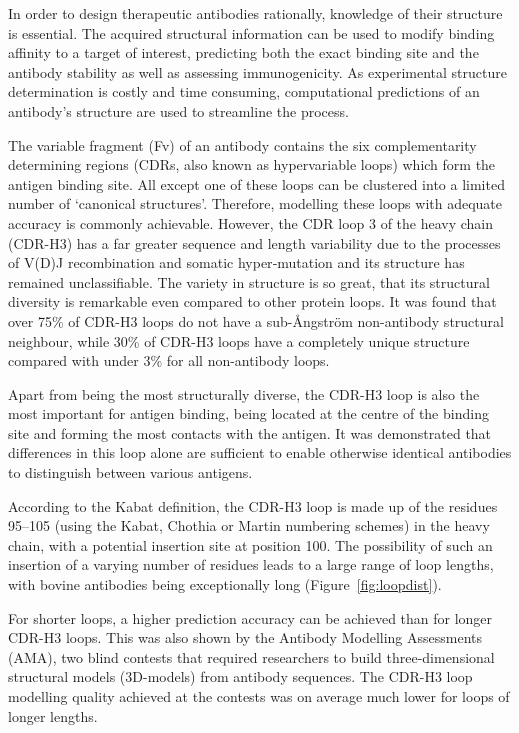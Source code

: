 \documentclass[12pt]{article}
\begin{document}
In order to design therapeutic antibodies rationally, knowledge of
their structure is essential. The acquired structural information can
be used to modify binding affinity to a target of interest,
predicting both the exact binding site and the antibody stability as
well as assessing immunogenicity\cite{Abhinandan2007}. As
experimental structure determination is costly and time
consuming, computational predictions of an antibody's structure are
used to streamline the process.

The variable
fragment (Fv) of an antibody contains the six complementarity determining regions
(CDRs, also known as hypervariable loops) which form the antigen binding site.
All except one of these loops can be clustered
into a limited number of `canonical structures'\cite{Al-Lazikani}. Therefore, modelling
these loops with adequate accuracy is commonly
achievable\cite{North2011}.  However, the CDR loop 3 of the 
heavy chain (CDR-H3) has a far greater sequence and length variability due to the
processes of V(D)J recombination and somatic hyper‐mutation and its
structure has remained unclassifiable\cite{Finn2016}. The variety in
structure is so great, that its structural diversity is remarkable
even compared to other protein loops\cite{Regep2017}. It was found
that over 75\% of CDR-H3 loops do not have a sub-{\AA}ngstr\"{o}m non-antibody
structural neighbour, while 30\% of CDR-H3 loops have a
completely unique structure compared with under 3\% for all non-antibody
loops\cite{Regep2017}.

Apart from being the most structurally diverse, the CDR-H3 loop is
also the most important for antigen binding, being located at the
centre of the binding site and forming the most contacts with the
antigen\cite{MacCallum1996}. It was demonstrated that
differences in this loop alone are sufficient to enable otherwise
identical antibodies to distinguish between various
antigens\cite{Xu2000}.

According to the Kabat definition, the CDR-H3 loop is made up of the
residues 95--105 (using the Kabat\cite{Kabat1992}, Chothia\cite{Al-Lazikani} or Martin\cite{Abhinandan2008} numbering schemes) in the heavy
chain, with a potential insertion site at position 100. The
possibility of such an insertion of a varying number of residues leads
to a large range of loop lengths, with bovine antibodies being
exceptionally long (Figure~\ref{fig:loopdist}).

For shorter loops, a higher prediction accuracy can be achieved than
for longer CDR-H3 loops. This was also shown by the Antibody Modelling
Assessments (AMA), two blind contests that required researchers to
build three-dimensional structural models (3D-models) from antibody sequences. The CDR-H3 loop
modelling quality achieved at the contests was on average much lower
for loops of longer lengths\cite{Almagro2011,Almagro2014}.
\end{document}
